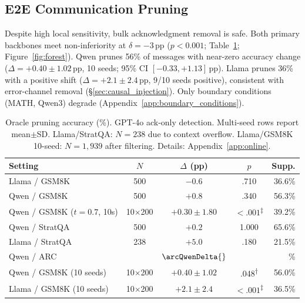 \subsection{E2E Communication Pruning}
\label{sec:e2e_pruning}

Despite high local sensitivity, bulk acknowledgment removal is safe. Both primary backbones meet non-inferiority at $\delta = -3$\,pp ($p < 0.001$; Table~\ref{tab:oracle_pruning}; Figure~\ref{fig:forest}). Qwen prunes 56\% of messages with near-zero accuracy change ($\Delta = +0.40 \pm 1.02$\,pp, 10 seeds; 95\% CI $[-0.33, +1.13]$\,pp). Llama prunes 36\% with a positive shift ($\Delta = +2.1 \pm 2.4$\,pp, 9/10 seeds positive), consistent with error-channel removal (\S\ref{sec:causal_injection}). Only boundary conditions (MATH, Qwen3) degrade (Appendix~\ref{app:boundary_conditions}).

\begin{table}[t]
\centering
\caption{Oracle pruning accuracy (\%). GPT-4o ack-only detection. Multi-seed rows report mean$\pm$SD. Llama/StratQA: $N{=}238$ due to context overflow. Llama/GSM8K 10-seed: $N{=}1{,}939$ after filtering. Details: Appendix~\ref{app:online}.\protect\footnotemark}
\label{tab:oracle_pruning}
\small
\begin{tabular}{lcccr}
\toprule
\textbf{Setting} & $N$ & $\Delta$ \textbf{(pp)} & $p$ & \textbf{Supp.} \\
\midrule
Llama / GSM8K & 500 & $-0.6$ & .710 & 36.6\% \\
Qwen / GSM8K & 500 & $+0.8$ & .340 & 56.3\% \\
Qwen / GSM8K ($t{=}0.7$, 10s) & 10${\times}$200 & $+0.30 \pm 1.80$ & ${<}.001$\textsuperscript{$\ddagger$} & 39.2\% \\
Qwen / StratQA & 500 & $+0.2$ & 1.000 & 65.6\% \\
Llama / StratQA & 238 & $+5.0$ & .180 & 21.5\% \\
Qwen / ARC & \arcN{} & $\arcQwenDelta{}$ & \arcQwenPvalue{} & \arcQwenSupp{}\% \\
Qwen / GSM8K (10 seeds) & 10${\times}$200 & $+0.40 \pm 1.02$ & .048\textsuperscript{$\dagger$} & 56.0\% \\
Llama / GSM8K (10 seeds) & 10${\times}$200 & $+2.1 \pm 2.4$ & ${<}.001$\textsuperscript{$\ddagger$} & 36.5\% \\
\bottomrule
\end{tabular}
\end{table}

